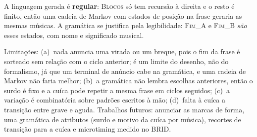 \documentclass{article}
\newcommand{\nt}[1]{\textsc{#1}}      %
\begin{document}
A linguagem gerada é \textbf{regular}: \nt{Blocos} só tem recursão à direita e o resto é
finito, então uma cadeia de Markov com estados de posição na frase geraria as mesmas
músicas. A gramática se justifica pela legibilidade: \nt{Fim\_A} e \nt{Fim\_B} \emph{são}
esses estados, com nome e significado musical.

Limitações: (a)~nada anuncia uma virada ou um breque, pois o fim da frase é sorteado sem
relação com o ciclo anterior; é um limite do desenho, não do formalismo, já que um terminal
de anúncio cabe na gramática, e uma cadeia de Markov não faria melhor;
(b)~a gramática não lembra escolhas anteriores, então o surdo é fixo e a cuíca pode repetir
a mesma frase em ciclos seguidos; (c)~a variação é combinatória sobre padrões escritos à mão;
(d)~falta à cuíca a transição entre grave e aguda.
Trabalhos futuros: anunciar as
marcas de forma, uma gramática de atributos (surdo e motivo da cuíca por música), recortes
de transição para a cuíca e microtiming medido no BRID.



\end{document}
